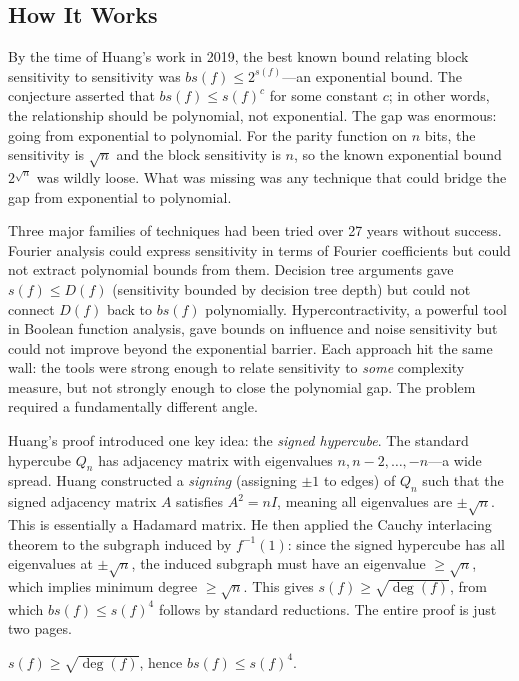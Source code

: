 \subsection{How It Works}

By the time of Huang's work in 2019, the best known bound relating block sensitivity to sensitivity was $bs(f) \leq 2^{s(f)}$---an exponential bound. The conjecture asserted that $bs(f) \leq s(f)^c$ for some constant $c$; in other words, the relationship should be polynomial, not exponential. The gap was enormous: going from exponential to polynomial. For the parity function on $n$ bits, the sensitivity is $\sqrt{n}$ and the block sensitivity is $n$, so the known exponential bound $2^{\sqrt{n}}$ was wildly loose. What was missing was any technique that could bridge the gap from exponential to polynomial.

Three major families of techniques had been tried over 27 years without success. Fourier analysis could express sensitivity in terms of Fourier coefficients but could not extract polynomial bounds from them. Decision tree arguments gave $s(f) \leq D(f)$ (sensitivity bounded by decision tree depth) but could not connect $D(f)$ back to $bs(f)$ polynomially. Hypercontractivity, a powerful tool in Boolean function analysis, gave bounds on influence and noise sensitivity but could not improve beyond the exponential barrier. Each approach hit the same wall: the tools were strong enough to relate sensitivity to \emph{some} complexity measure, but not strongly enough to close the polynomial gap. The problem required a fundamentally different angle.

Huang's proof introduced one key idea: the \emph{signed hypercube}. The standard hypercube $Q_n$ has adjacency matrix with eigenvalues $n, n-2, \ldots, -n$---a wide spread. Huang constructed a \emph{signing} (assigning $\pm 1$ to edges) of $Q_n$ such that the signed adjacency matrix $A$ satisfies $A^2 = nI$, meaning all eigenvalues are $\pm\sqrt{n}$. This is essentially a Hadamard matrix. He then applied the Cauchy interlacing theorem to the subgraph induced by $f^{-1}(1)$: since the signed hypercube has all eigenvalues at $\pm\sqrt{n}$, the induced subgraph must have an eigenvalue $\geq \sqrt{n}$, which implies minimum degree $\geq \sqrt{n}$. This gives $s(f) \geq \sqrt{\deg(f)}$, from which $bs(f) \leq s(f)^4$ follows by standard reductions. The entire proof is just two pages.

\begin{theorem}
$s(f) \ge \sqrt{\deg(f)}$, hence $bs(f) \le s(f)^4$.
\end{theorem}

